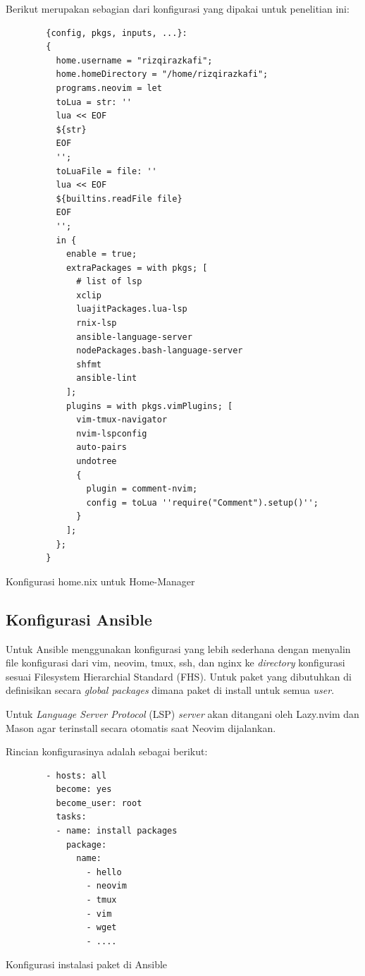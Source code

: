 \documentclass[10pt,]{report}
\newenvironment{code}{\captionsetup{type=listing}}{\vspace{3mm}}
\begin{document}
\begin{adjustwidth}{20pt}{}
\begin{adjustwidth}{20pt}{}
		Berikut merupakan sebagian dari konfigurasi yang dipakai untuk penelitian ini:

		\begin{code}
			\begin{verbatim}
        {config, pkgs, inputs, ...}:
        {
          home.username = "rizqirazkafi";
          home.homeDirectory = "/home/rizqirazkafi";
          programs.neovim = let
          toLua = str: ''
          lua << EOF
          ${str}
          EOF
          '';
          toLuaFile = file: ''
          lua << EOF
          ${builtins.readFile file}
          EOF
          '';
          in {
            enable = true;
            extraPackages = with pkgs; [
              # list of lsp
              xclip
              luajitPackages.lua-lsp
              rnix-lsp
              ansible-language-server
              nodePackages.bash-language-server
              shfmt
              ansible-lint
            ];
            plugins = with pkgs.vimPlugins; [
              vim-tmux-navigator
              nvim-lspconfig
              auto-pairs
              undotree
              {
                plugin = comment-nvim;
                config = toLua ''require("Comment").setup()'';
              }
            ];
          };
        }
      \end{verbatim}
			\caption{Konfigurasi home.nix untuk Home-Manager}
		\end{code}
	\end{adjustwidth}
	\subsection{Konfigurasi Ansible}
	\vspace{-3mm}
	\begin{adjustwidth}{20pt}{}
		\hspace\parindent
		Untuk Ansible menggunakan konfigurasi yang lebih sederhana dengan menyalin
		file konfigurasi dari vim, neovim, tmux, ssh, dan nginx ke
		\textit{directory} konfigurasi sesuai Filesystem Hierarchial Standard
		(FHS). Untuk paket yang dibutuhkan di definisikan secara \textit{global
			packages} dimana paket di install untuk semua \textit{user}.

		Untuk \textit{Language Server Protocol} (LSP) \textit{server} akan
		ditangani oleh Lazy.nvim dan Mason agar terinstall secara otomatis
		saat Neovim dijalankan.

		Rincian konfigurasinya adalah sebagai berikut:

		\begin{code}
			\begin{verbatim}
        - hosts: all
          become: yes
          become_user: root
          tasks:
          - name: install packages
            package:
              name:
                - hello
                - neovim
                - tmux
                - vim
                - wget
                - ....
      \end{verbatim}
			\caption{Konfigurasi instalasi paket di Ansible}
		\end{code}


\end{adjustwidth}
\end{adjustwidth}
\end{document}
